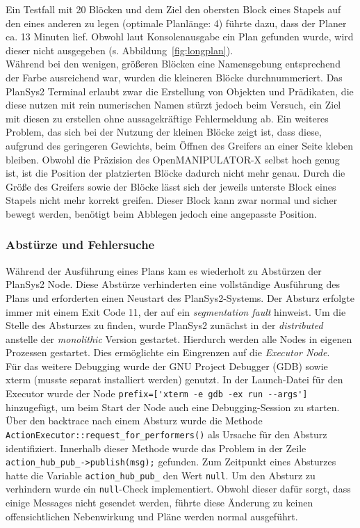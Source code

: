 Ein Testfall mit 20 Blöcken und dem Ziel den obersten Block eines Stapels auf den eines anderen zu legen (optimale Planlänge: 4) führte dazu, dass der Planer ca. 13 Minuten lief.
Obwohl laut Konsolenausgabe ein Plan gefunden wurde, wird dieser nicht ausgegeben (s. Abbildung~\ref{fig:longplan}).\\
Während bei den wenigen, größeren Blöcken eine Namensgebung entsprechend der Farbe ausreichend war, wurden die kleineren Blöcke durchnummeriert.
Das \ac{PlanSys2} Terminal erlaubt zwar die Erstellung von Objekten und Prädikaten, die diese nutzen mit rein numerischen Namen stürzt jedoch beim Versuch, ein Ziel mit diesen zu erstellen ohne aussagekräftige Fehlermeldung ab.
Ein weiteres Problem, das sich bei der Nutzung der kleinen Blöcke zeigt ist, dass diese, aufgrund des geringeren Gewichts, beim Öffnen des Greifers an einer Seite kleben bleiben.
Obwohl die Präzision des OpenMANIPULATOR-X selbst hoch genug ist, ist die Position der platzierten Blöcke dadurch nicht mehr genau.
Durch die Größe des Greifers sowie der Blöcke lässt sich der jeweils unterste Block eines Stapels nicht mehr korrekt greifen.
Dieser Block kann zwar normal und sicher bewegt werden, benötigt beim Abblegen jedoch eine angepasste Position.
\subsubsection{Abstürze und Fehlersuche}
Während der Ausführung eines Plans kam es wiederholt zu Abstürzen der \ac{PlanSys2} Node.
Diese Abstürze verhinderten eine vollständige Ausführung des Plans und erforderten einen Neustart des \ac{PlanSys2}-Systems.
Der Absturz erfolgte immer mit einem Exit Code 11, der auf ein \emph{segmentation fault} hinweist.
Um die Stelle des Absturzes zu finden, wurde \ac{PlanSys2} zunächst in der \emph{distributed} anstelle der \emph{monolithic} Version gestartet.
Hierdurch werden alle Nodes in eigenen Prozessen gestartet.
Dies ermöglichte ein Eingrenzen auf die \emph{Executor Node}.\\
Für das weitere Debugging wurde der GNU Project Debugger (GDB) sowie xterm (musste separat installiert werden) genutzt.
In der Launch-Datei für den Executor wurde der Node \verb|prefix=['xterm -e gdb -ex run --args']| hinzugefügt, um beim Start der Node auch eine Debugging-Session zu starten.\\
Über den backtrace nach einem Absturz wurde die Methode\\\verb|ActionExecutor::request_for_performers()| als Ursache für den Absturz identifiziert.
Innerhalb dieser Methode wurde das Problem in der Zeile\\\verb|action_hub_pub_->publish(msg);| gefunden.
Zum Zeitpunkt eines Absturzes hatte die Variable \verb|action_hub_pub_| den Wert \verb|null|.
Um den Absturz zu verhindern wurde ein \verb|null|-Check implementiert.
Obwohl dieser dafür sorgt, dass einige Messages nicht gesendet werden, führte diese Änderung zu keinen offensichtlichen Nebenwirkung und Pläne werden normal ausgeführt.


